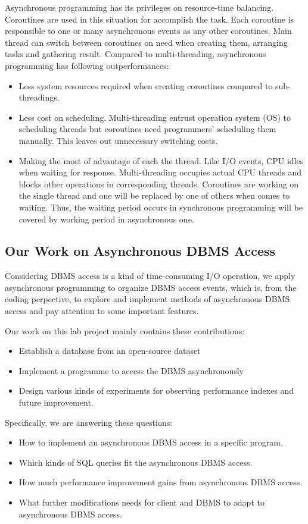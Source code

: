 \documentclass[onecolumn, conference, 12pt]{IEEEtran}
\begin{document}
	Asynchronous programming has its privileges on resource-time balancing. Coroutines are used in this situation for accomplish the task. Each coroutine is responsible to one or many asynchronous events as any other coroutines. Main thread can switch between coroutines on need when creating them, arranging tasks and gathering result. Compared to multi-threading, asynchronous programming has following outperformances:
	\begin{itemize}[]
	\item Less system resources required when creating coroutines compared to sub-threadings. 
	\item Less cost on scheduling. Multi-threading entrust operation system (OS) to scheduling threads but coroutines need programmers' scheduling them manually. This leaves out unnecessary switching costs.
	\item Making the most of advantage of each the thread. Like I/O events, CPU idles when waiting for response. Multi-threading occupies actual CPU threads and blocks other operations in corresponding threads. Coroutines are working on the single thread and one will be replaced by one of others when comes to waiting. Thus, the waiting period occurs in synchronous programming will be covered by working period in asynchronous one.
	\end{itemize}

	\subsection{Our Work on Asynchronous DBMS Access}
	Considering DBMS access is a kind of time-consuming I/O operation, we apply asynchronous programming to organize DBMS access events, which is, from the coding perpective, to explore and implement methods of asynchronous DBMS access and pay attention to some important features. 

	Our work on this lab project mainly contains these contributions:
	\begin{itemize}
		\item Establish a database from an open-source dataset
		\item Implement a programme to access the DBMS asynchronously
		\item Design various kinds of experiments for observing performance indexes and future improvement.
	\end{itemize}

	Specifically, we are answering these questions:
	\begin{itemize}
		\item How to implement an asynchronous DBMS access in a specific program.
		\item Which kinds of SQL queries fit the asynchronous DBMS access.
		\item How much performance improvement gains from asynchronous DBMS access.
		\item What further modifications needs for client and DBMS to adapt to asynchronous DBMS access.
	\end{itemize}
	
\end{document}
